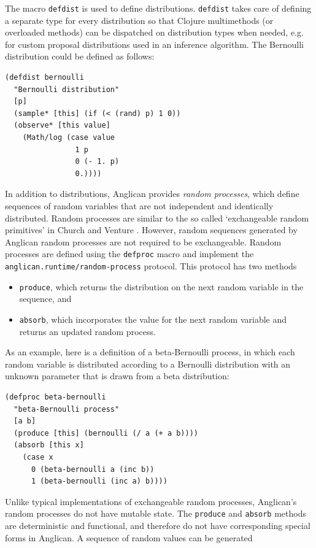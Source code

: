 \documentclass[preprint]{sigplanconf}
\begin{document}
The macro \texttt{defdist} is used to define distributions.
\texttt{defdist} takes care of defining a separate type
for every distribution so that Clojure multimethods (or overloaded
methods) can be dispatched on
distribution types when needed, e.g. for custom proposal distributions 
used in an inference algorithm. The
Bernoulli distribution could be defined as follows:
\begin{lstlisting}[style=default]
(defdist bernoulli
  "Bernoulli distribution"
  [p]
  (sample* [this] (if (< (rand) p) 1 0))
  (observe* [this value]
    (Math/log (case value
                1 p
                0 (- 1. p)
                0.))))
\end{lstlisting}

In addition to distributions, Anglican provides \textit{random processes},
which define sequences of random variables that are not independent and
identically distributed. Random processes are similar to the so called
`exchangeable random primitives' in Church \cite{GMR+08} and
Venture \cite{MSP14}. However, random sequences generated by Anglican random 
processes are not required to be exchangeable. Random processes are
defined using the \texttt{defproc} macro and implement the
\texttt{anglican.runtime/{\linebreak[0]}random-process} protocol. This
protocol has two methods
\begin{itemize}
\item \texttt{produce}, which returns the distribution on the next
random variable in the sequence, and
\item \texttt{absorb}, which incorporates the value for the next random
variable and returns an updated random process.
\end{itemize}
 As an example, here is a definition of a beta-Bernoulli process, in which
each random variable is distributed according to a Bernoulli distribution with
an unknown parameter that is drawn from a beta distribution:
\begin{lstlisting}[style=default]
(defproc beta-bernoulli
  "beta-Bernoulli process"
  [a b]
  (produce [this] (bernoulli (/ a (+ a b))))
  (absorb [this x]
    (case x
      0 (beta-bernoulli a (inc b))
      1 (beta-bernoulli (inc a) b))))
\end{lstlisting}
Unlike typical implementations of exchangeable random processes,
Anglican's random processes do not have mutable state. The
\texttt{produce} and \texttt{absorb} methods are deterministic
and functional, and therefore do not have corresponding special
forms in Anglican. A sequence of random values can be generated
\end{document}
